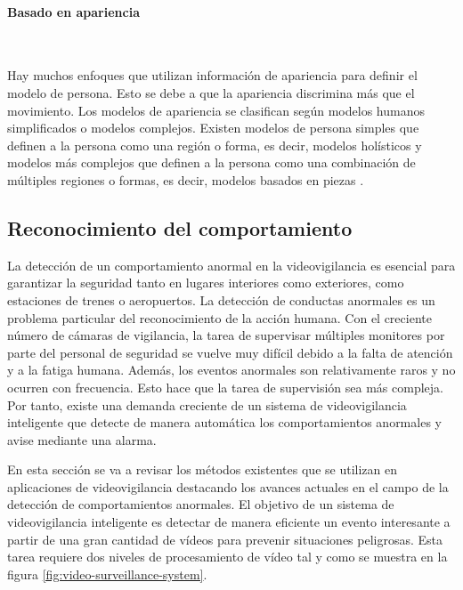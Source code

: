 \paragraph*{Basado en apariencia}\mbox{} \\
\label{parag:basado-apariencia-people-model}

Hay muchos enfoques que utilizan información de apariencia para definir el modelo de persona. Esto se debe a que la apariencia discrimina más que el movimiento. Los modelos de apariencia se clasifican según modelos humanos simplificados o modelos complejos. Existen modelos de persona simples que definen a la persona como una región o forma, es decir, modelos holísticos \cite{1334092} y modelos más complejos que definen a la persona como una combinación de múltiples regiones o formas, es decir, modelos basados en piezas \cite{5255236}.

\subsection{Reconocimiento del comportamiento}
\label{subsec:tecnicas-reconocimiento-comportamiento}

La detección de un comportamiento anormal en la videovigilancia es esencial para garantizar la seguridad tanto en lugares interiores como exteriores, como estaciones de trenes o aeropuertos. La detección de conductas anormales es un problema particular del reconocimiento de la acción humana. Con el creciente número de cámaras de vigilancia, la tarea de supervisar múltiples monitores por parte del personal de seguridad se vuelve muy difícil debido a la falta de atención y a la fatiga humana. Además, los eventos anormales son relativamente raros y no ocurren con frecuencia. Esto hace que la tarea de supervisión sea más compleja. Por tanto, existe una demanda creciente de un sistema de videovigilancia inteligente que detecte de manera automática los comportamientos anormales y avise mediante una alarma.

En esta sección se va a revisar los métodos existentes \cite{BENMABROUK2018480} que se utilizan en aplicaciones de videovigilancia destacando los avances actuales en el campo de la detección de comportamientos anormales. El objetivo de un sistema de videovigilancia inteligente es detectar de manera eficiente un evento interesante a partir de una gran cantidad de vídeos para prevenir situaciones peligrosas. Esta tarea requiere dos niveles de procesamiento de vídeo tal y como se muestra en la figura \ref{fig:video-surveillance-system}.

